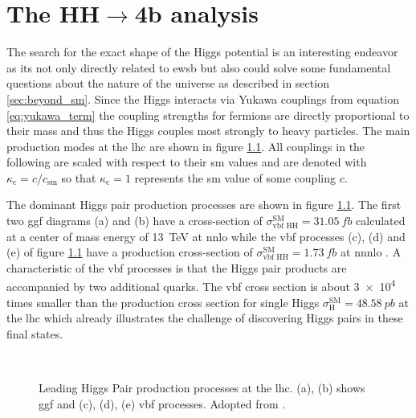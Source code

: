 \chapter{The HH$\rightarrow$4b analysis}

The search for the exact shape of the Higgs potential is an interesting endeavor as its not only  directly related to \ac{ewsb} but also could solve some fundamental questions about the nature of the universe as described in section \ref{sec:beyond_sm}. Since the Higgs interacts via Yukawa couplings from equation \ref{eq:yukawa_term} the coupling strengths for fermions are directly proportional to their mass and thus the Higgs couples most strongly to heavy particles. The main production modes at the \ac{lhc} are shown in figure \ref{fig:main_production_processes}. All couplings in the following are scaled with respect to their \ac{sm} values and are denoted with $\kappa_\mathrm{c} = c/c_\mathrm{sm}$ so that $\kappa_\mathrm{c}=1$ represents the \ac{sm} value of some coupling $c$.

The dominant Higgs pair production processes are shown in figure \ref{fig:main_production_processes}. The first two \ac{ggf} diagrams (a) and (b) have a cross-section of
$\sigma_\text{vbf HH}^\text{SM}=\qty[]{31.05}{fb}$ calculated at a center of mass energy of \qty[]{13}{TeV} at \ac{nnlo} \citep{Grazzini_2018} while the \ac{vbf} processes (c), (d) and (e) of figure \ref{fig:main_production_processes} have a production cross-section of
$\sigma_\text{vbf HH}^\text{SM}=\qty[]{1.73}{fb}$ at \ac{nnnlo} \citep{PhysRevD.98.114016}. A characteristic of the \ac{vbf} processes is that the Higgs pair products are accompanied by two additional quarks. The \ac{vbf} cross section is about \qty[]{3e4}{} times smaller than the production cross section for single Higgs $\sigma_\text{H}^\text{SM}=\qty[]{48.58}{pb}$ at the \ac{lhc} \citep{de2016arxiv} which already illustrates the challenge of discovering Higgs pairs in these final states.
\begin{figure}
    \centering
    \hspace{.06\textwidth}
     \\
    \hspace{.01\textwidth}
    \hspace{.01\textwidth}
    \caption[]{Leading Higgs Pair production processes at the \ac{lhc}. (a), (b) shows \ac{ggf} and (c), (d), (e) \ac{vbf} processes. Adopted from \citep{aad2023search}.}
    \label{fig:main_production_processes}
\end{figure}

